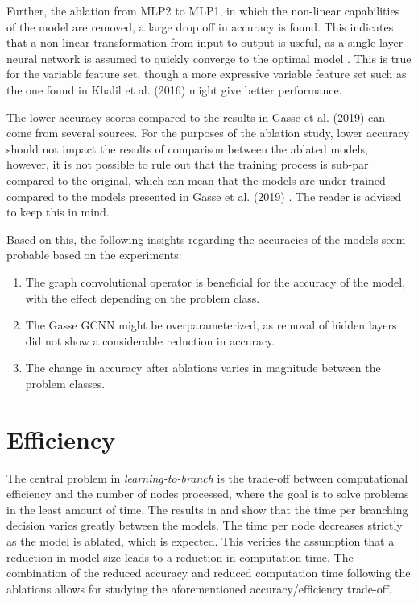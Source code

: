 Further, the ablation from MLP2 to MLP1, in which the non-linear capabilities of the model are removed, a large drop off in accuracy is found. This indicates that a non-linear transformation from input to output is useful, as a single-layer neural network is assumed to quickly converge to the optimal model \cite{goodfellow2016deep}. This is true for the variable feature set, though a more expressive variable feature set such as the one found in Khalil et al. (2016) \cite{khalil2016learning} might give better performance.



The lower accuracy scores compared to the results in Gasse et al. (2019) \cite{gasse2019exact} can come from several sources. For the purposes of the ablation study, lower accuracy should not impact the results of comparison between the ablated models, however, it is not possible to rule out that the training process is sub-par compared to the original, which can mean that the models are under-trained compared to the models presented in Gasse et al. (2019) \cite{gasse2019exact}. The reader is advised to keep this in mind. 



Based on this, the following insights regarding the accuracies of the models seem probable based on the experiments:
\begin{enumerate}[label=(\roman*)]
    \item The graph convolutional operator is beneficial for the accuracy of the model, with the effect depending on the problem class.
    \item The Gasse GCNN might be overparameterized, as removal of hidden layers did not show a considerable reduction in accuracy.
    \item The change in accuracy after ablations varies in magnitude between the problem classes.
\end{enumerate}


\section{Efficiency}\label{sec:disc_efficiency}



The central problem in \textit{learning-to-branch} is the trade-off between computational efficiency and the number of nodes processed, where the goal is to solve problems in the least amount of time. The results in  and  show that the time per branching decision varies greatly between the models. The time per node decreases strictly as the model is ablated, which is expected. This verifies the assumption that a reduction in model size leads to a reduction in computation time. The combination of the reduced accuracy and reduced computation time following the ablations allows for studying the aforementioned accuracy/efficiency trade-off. 

